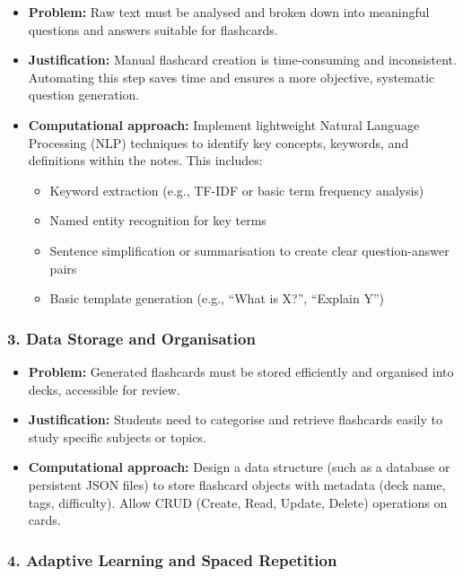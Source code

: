 \documentclass[a4paper,12pt]{article}
\begin{document}
\begin{itemize}
    \item \textbf{Problem:} Raw text must be analysed and broken down into meaningful questions and answers suitable for flashcards.
    \item \textbf{Justification:} Manual flashcard creation is time-consuming and inconsistent. Automating this step saves time and ensures a more objective, systematic question generation.
    \item \textbf{Computational approach:} Implement lightweight Natural Language Processing (NLP) techniques to identify key concepts, keywords, and definitions within the notes. This includes:
    \begin{itemize}
        \item Keyword extraction (e.g., TF-IDF or basic term frequency analysis)
        \item Named entity recognition for key terms
        \item Sentence simplification or summarisation to create clear question-answer pairs
        \item Basic template generation (e.g., “What is X?”, “Explain Y”)
    \end{itemize}
\end{itemize}

\subsubsection*{3. Data Storage and Organisation}

\begin{itemize}
    \item \textbf{Problem:} Generated flashcards must be stored efficiently and organised into decks, accessible for review.
    \item \textbf{Justification:} Students need to categorise and retrieve flashcards easily to study specific subjects or topics.
    \item \textbf{Computational approach:} Design a data structure (such as a database or persistent JSON files) to store flashcard objects with metadata (deck name, tags, difficulty). Allow CRUD (Create, Read, Update, Delete) operations on cards.
\end{itemize}

\subsubsection*{4. Adaptive Learning and Spaced Repetition}
\end{document}
